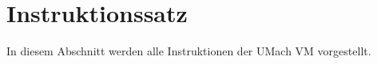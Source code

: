 \chapter{Instruktionssatz}

In diesem Abschnitt werden alle Instruktionen der UMach VM
vorgestellt.




